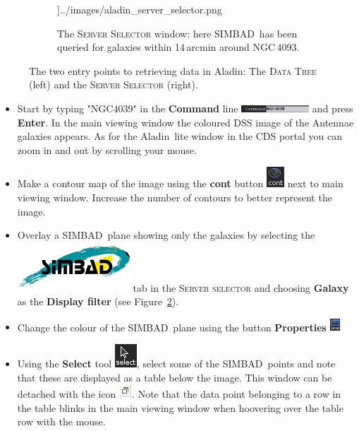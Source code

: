 \documentclass [a4paper, 12pt]{article}
\newcommand{\aladin}{{\textsc{A}{ladin}}}
\newcommand{\simbad}{{\textsc{SIMBAD}}}
\begin{document}
\begin{figure}[H]
\begin{subfigure}[H]{0.4\textwidth}
        \textwidth]{../images/aladin_server_selector.png}
        \caption{The \textsc{Server Selector} window: here \simbad\ has been 
        queried for galaxies within 14\,arcmin around NGC\,4093.}
        \label{fig:server_selector}
    \end{subfigure}
    \caption{The two entry points to retrieving data in Aladin: The 
    \textsc{Data Tree} (left) and the \textsc{Server Selector} (right).}
\end{figure}

\begin{itemize}
    \item Start by typing "NGC4039" in the \textbf{Command} line 
\includegraphics[width=0.2\textwidth]{../images/aladin_command_ngc4039.png} 
and press \textbf{Enter}. In the main viewing window the coloured DSS image of 
the Antennae galaxies appears. As for the \aladin\ lite window in the CDS 
portal you can zoom in and out by scrolling your mouse. 

    \item Make a contour map of the image using the \textbf{cont} button 
\includegraphics[width=0.03  \textwidth]{../images/aladin_button_contours.png} 
next to main viewing window. Increase the number of contours to better 
represent the image. 
    
    \item Overlay a \simbad\ plane showing only the galaxies by selecting 
the \includegraphics[width=0.055  \textwidth]{../images/logo_simbad.png} tab  
in 
the 
\textsc{Server selector} and choosing \textbf{Galaxy} as the \textbf{Display 
filter} (see Figure~\ref{fig:server_selector}).

    \item Change the colour of the \simbad\ plane using the button 
\textbf{Properties} 
\includegraphics[width=0.03\textwidth]{../images/aladin_button_properties.png}  

    \item Using the \textbf{Select} tool \includegraphics[width=0.03  
\textwidth]{../images/aladin_button_select.png}, select some of the \simbad\ 
points and note that these are displayed as a table below the image. This 
window can be detached with the icon \includegraphics[width=0.035  
\textwidth]{../images/aladin_button_detach-table.png}. Note that the data point 
belonging to a row in the table blinks in the main viewing window when 
hoovering over the table row with the mouse.


\end{itemize}
\end{document}
